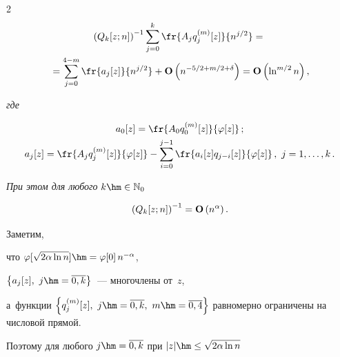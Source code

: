 \begin{multicols}{2}
 \begin{multline*}


 \left(Q_k[z;n]\right)^{-1}


 \sum\limits_{j=0}^k \fr{A_j q_j^{(m)}[z]}{n^{j/2}} ={}\\


 {}=


 \sum\limits_{j=0}^{4-m} \fr{a_j[z]}{n^{j/2}}


 +\Op\left(n^{-5/2+m/2+\delta}\right)=


\Op\left(\ln^{m/2} n\right),




 \end{multline*}


\textit{где}


 \begin{gather*}


 a_0[z]=\fr{A_0 q_0^{(m)}[z]}{\varphi[z]}\,;\\


 a_j[z]=\fr{A_j q_j^{(m)}[z]}{\varphi[z]}


-\sum\limits_{i=0}^{j-1} \fr{a_i[z] q_{j-i}[z]}{\varphi[z]}\,,\


j=1,\ldots,k\,.


 \end{gather*}


 \textit{При этом для любого} $k\hm\in \mathbb{N}_0$


  \begin{equation}


  \left(Q_k[z;n]\right)^{-1}= \Op\left(n^{\alpha}\right).


 \label{L:5.5-2}


 \end{equation}








\smallskip





 \Do


 Заметим,


 что $\varphi[\sqrt{2\alpha\ln n}]\hm=\varphi[0]\,n^{-\alpha}$,


 $\left\{a_j[z],\ j\hm=\overline{0,k}\right\}$~--- многочлены от~$z$,


 а~функции $\left\{q_j^{(m)}[z],\ j\hm=\overline{0,k},\ m\hm=\overline{0,4}\right\}$ равномерно ограничены на числовой прямой.


 Поэтому для любого $j\hm=\overline{0,k}$ при $|z|\hm\le \sqrt{2\alpha\ln n}$



\end{multicols}
